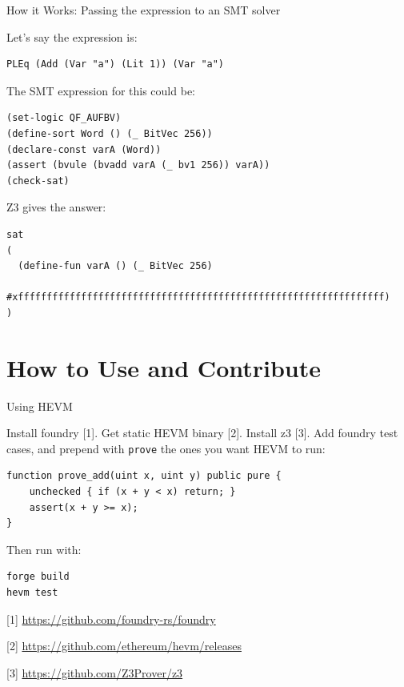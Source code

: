 \documentclass{beamer}
\begin{document}
\begin{frame}[fragile=singleslide]{How it Works: Passing the expression to an SMT solver}

Let's say the expression is:

\begin{Verbatim}[frame=single, framerule=0.2mm, framesep=2mm,fontsize=\footnotesize]
PLEq (Add (Var "a") (Lit 1)) (Var "a")
\end{Verbatim}
\bigskip

The SMT expression for this could be:

\begin{Verbatim}[frame=single, framerule=0.2mm, framesep=2mm,fontsize=\footnotesize]
(set-logic QF_AUFBV)
(define-sort Word () (_ BitVec 256))
(declare-const varA (Word))
(assert (bvule (bvadd varA (_ bv1 256)) varA))
(check-sat)
\end{Verbatim}

Z3 gives the answer:

\begin{Verbatim}[frame=single, framerule=0.2mm, framesep=2mm,fontsize=\footnotesize]
sat
(
  (define-fun varA () (_ BitVec 256)
    #xffffffffffffffffffffffffffffffffffffffffffffffffffffffffffffffff)
)
\end{Verbatim}
\end{frame}

\section{How to Use and Contribute}
\begin{frame}[fragile=singleslide]{Using HEVM}

Install foundry [1]. Get static HEVM binary [2]. Install z3 [3]. Add foundry test cases, and prepend with \texttt{prove} the ones you want HEVM to run:

\begin{Verbatim}[frame=single, framerule=0.2mm, framesep=2mm,fontsize=\footnotesize]
function prove_add(uint x, uint y) public pure {
    unchecked { if (x + y < x) return; }
    assert(x + y >= x);
}
\end{Verbatim}

Then run with:

\begin{Verbatim}[frame=single, framerule=0.2mm, framesep=2mm,fontsize=\footnotesize]
forge build
hevm test
\end{Verbatim}


\bigskip

[1] \url{https://github.com/foundry-rs/foundry}

[2] \url{https://github.com/ethereum/hevm/releases}

[3] \url{https://github.com/Z3Prover/z3}
\end{frame}
\end{document}
